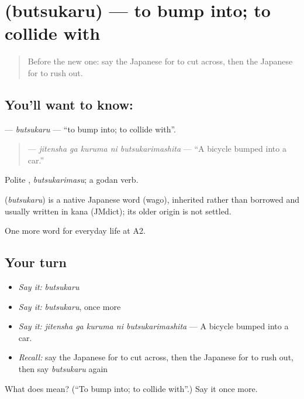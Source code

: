 \section[\texorpdfstring{\ja{ぶつかる} (butsukaru)}{ぶつかる (butsukaru)}]{ (butsukaru) — to bump into; to collide with}

\label{lesson:JA-C201-butsukaru}



\begin{quote}
Before the new one: say the Japanese for to cut across, then the Japanese for to rush out.
\end{quote}

\subsection*{You'll want to know: }
\textbf{} — \emph{butsukaru} — \textquotedblleft{}to bump into; to collide with\textquotedblright{}.

\begin{quote}
\textbf{  } — \emph{jitensha ga kuruma ni butsukarimashita} — \textquotedblleft{}A bicycle bumped into a car.\textquotedblright{}
\end{quote}

Polite \textbf{}, \emph{butsukarimasu}; a godan verb.

\begin{cousinweb}
\textbf{} (\emph{butsukaru}) is a native Japanese word (wago), inherited rather than borrowed and usually written in kana (JMdict); its older origin is not settled.
\end{cousinweb}

\begin{grammarlens}[title={What you've built}]
One more word for everyday life at A2.
\end{grammarlens}

\subsection*{Your turn}
\begin{itemize}
\raggedright
  \item \emph{Say it:} \emph{butsukaru}
  \item \emph{Say it:} \emph{butsukaru}, once more
  \item \emph{Say it:} \emph{jitensha ga kuruma ni butsukarimashita} — A bicycle bumped into a car.
  \item \emph{Recall:} say the Japanese for to cut across, then the Japanese for to rush out, then say \emph{butsukaru} again
\end{itemize}

\begin{tcolorbox}[breakable,colback=teal!4,colframe=teal!35!black,title={Before you move on}]
What does  mean? (\textquotedblleft{}To bump into; to collide with\textquotedblright{}.) Say it once more.
\end{tcolorbox}
